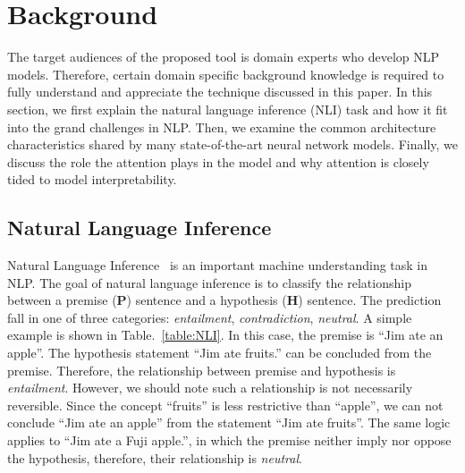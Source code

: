 \section{Background}
The target audiences of the proposed tool is domain experts who develop NLP models. Therefore, certain domain specific background knowledge is required to fully understand and appreciate the technique discussed in this paper. In this section, we first explain the natural language inference (NLI) task and how it fit into the grand challenges in NLP. Then, we examine the common architecture characteristics shared by many state-of-the-art neural network models. Finally, we discuss the role the attention plays in the model and why attention is closely tided to model interpretability.

\subsection{Natural Language Inference}
\label{sec:languageInference}
Natural Language Inference~\cite{DaganRothSammons2013} is an important machine understanding task in NLP.
The goal of natural language inference is to classify the relationship between a premise (\textbf{P}) sentence and a hypothesis (\textbf{H}) sentence. 
The prediction fall in one of three categories: \emph{entailment}, \emph{contradiction}, \emph{neutral}.
A simple example is shown in Table.~\ref{table:NLI}.
In this case, the premise is ``Jim ate an apple''. 
The hypothesis statement ``Jim ate fruits.'' can be concluded from the premise. Therefore, the relationship between premise and hypothesis is \emph{entailment}. However, we should note such a relationship is not necessarily reversible. Since the concept ``fruits'' is less restrictive than ``apple'', we can not conclude ``Jim ate an apple'' from the statement ``Jim ate fruits''. The same logic applies to ``Jim ate a Fuji apple.'', in which the premise neither imply nor oppose the hypothesis, therefore, their relationship is \emph{neutral}.

